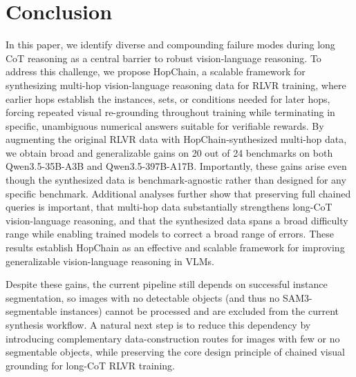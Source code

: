 \section{Conclusion}

In this paper, we identify diverse and compounding failure modes during long CoT reasoning as a central barrier to robust vision-language reasoning. To address this challenge, we propose HopChain, a scalable framework for synthesizing multi-hop vision-language reasoning data for RLVR training, where earlier hops establish the instances, sets, or conditions needed for later hops, forcing repeated visual re-grounding throughout training while terminating in specific, unambiguous numerical answers suitable for verifiable rewards. By augmenting the original RLVR data with HopChain-synthesized multi-hop data, we obtain broad and generalizable gains on 20 out of 24 benchmarks on both Qwen3.5-35B-A3B and Qwen3.5-397B-A17B. Importantly, these gains arise even though the synthesized data is benchmark-agnostic rather than designed for any specific benchmark. Additional analyses further show that preserving full chained queries is important, that multi-hop data substantially strengthens long-CoT vision-language reasoning, and that the synthesized data spans a broad difficulty range while enabling trained models to correct a broad range of errors. These results establish HopChain as an effective and scalable framework for improving generalizable vision-language reasoning in VLMs.

Despite these gains, the current pipeline still depends on successful instance segmentation, so images with no detectable objects (and thus no SAM3-segmentable instances) cannot be processed and are excluded from the current synthesis workflow. A natural next step is to reduce this dependency by introducing complementary data-construction routes for images with few or no segmentable objects, while preserving the core design principle of chained visual grounding for long-CoT RLVR training.
